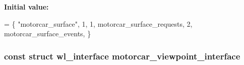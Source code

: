 {\bfseries Initial value\-:}
\begin{DoxyCode}
= \{
    \textcolor{stringliteral}{"motorcar\_surface"}, 1,
    1, motorcar\_surface\_requests,
    2, motorcar\_surface\_events,
\}
\end{DoxyCode}
\hypertarget{motorcar-client-protocol_8h_a90843869d07a9812f0b0eb66ed03ed20}{
\subsubsection[{motorcar\-\_\-viewpoint\-\_\-interface}]{\setlength{\rightskip}{0pt plus 5cm}const struct wl\-\_\-interface motorcar\-\_\-viewpoint\-\_\-interface}}\label{motorcar-client-protocol_8h_a90843869d07a9812f0b0eb66ed03ed20}
